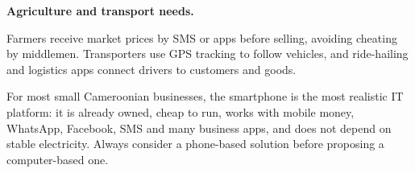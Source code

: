 \documentclass[11pt]{article}
\newcommand{\cle}[1]{{\popxbold\color{popdark}#1}}
\begin{document}
\textbf{Agriculture and transport needs.}\par
Farmers receive \cle{market prices by SMS or apps} before selling, avoiding cheating by middlemen. Transporters use \cle{GPS tracking} to follow vehicles, and \cle{ride-hailing and logistics apps} connect drivers to customers and goods.

\begin{aretenir}
For most small Cameroonian businesses, the \cle{smartphone} is the most realistic IT platform: it is already owned, cheap to run, works with mobile money, WhatsApp, Facebook, SMS and many business apps, and does not depend on stable electricity. Always consider a phone-based solution before proposing a computer-based one.
\end{aretenir}
\end{document}
